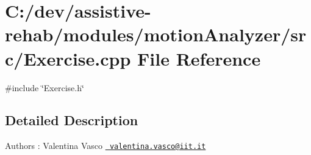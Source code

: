 \section{C\+:/dev/assistive-\/rehab/modules/motion\+Analyzer/src/\+Exercise.cpp File Reference}
\label{Exercise_8cpp}
{\ttfamily \#include \char`\"{}Exercise.\+h\char`\"{}}\newline


\subsection{Detailed Description}
\begin{DoxyAuthor}{Authors}
\+: Valentina Vasco \href{mailto:valentina.vasco@iit.it}{\texttt{ valentina.\+vasco@iit.\+it}} 
\end{DoxyAuthor}
